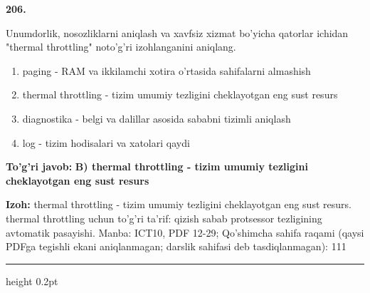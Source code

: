 \documentclass[10pt,a4paper]{article}
\begin{document}
{\bfseries\sffamily\color{ink} 206.}
\par
Unumdorlik, nosozliklarni aniqlash va xavfsiz xizmat bo'yicha qatorlar ichidan "thermal throttling" noto'g'ri izohlanganini aniqlang.
\begin{enumerate}[label=\Alph*),leftmargin=9mm]
\item paging - RAM va ikkilamchi xotira o'rtasida sahifalarni almashish
\item thermal throttling - tizim umumiy tezligini cheklayotgan eng sust resurs
\item diagnostika - belgi va dalillar asosida sababni tizimli aniqlash
\item log - tizim hodisalari va xatolari qaydi
\end{enumerate}
\begin{tcolorbox}[enhanced,breakable,colback=teal!4,colframe=teal!60!black,boxrule=0.45pt,arc=1.2mm,left=2.7mm,right=2.7mm,top=1.8mm,bottom=1.8mm,before skip=2mm,after skip=2mm]
{\bfseries\sffamily\color{teal}To'g'ri javob:} \textbf{B) thermal throttling - tizim umumiy tezligini cheklayotgan eng sust resurs}
\par\smallskip
{\bfseries Izoh:} thermal throttling - tizim umumiy tezligini cheklayotgan eng sust resurs. thermal throttling uchun to'g'ri ta'rif: qizish sabab protsessor tezligining avtomatik pasayishi. Manba: ICT10, PDF 12-29; Qo'shimcha sahifa raqami (qaysi PDFga tegishli ekani aniqlanmagan; darslik sahifasi deb tasdiqlanmagan): 111
\end{tcolorbox}
\vspace{2mm}\hrule height 0.2pt\vspace{3mm}
\end{document}
